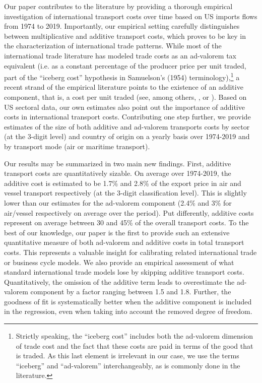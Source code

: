 \documentclass[a4paper,11pt]{article}
\begin{document}
Our paper contributes to the literature by providing a thorough empirical investigation of international transport costs over time based on US imports flows from 1974 to 2019. Importantly, our empirical setting carefully distinguishes between multiplicative and additive transport costs, which proves to be key in the characterization of international trade patterns. While most of the international trade literature has modeled trade costs as an ad-valorem tax equivalent (i.e. as a constant percentage of the producer price per unit traded, part of the ``iceberg cost'' hypothesis in Samuelson's (1954) terminology\cite{samuelson1954}),\footnote{Strictly speaking, the ``iceberg cost'' includes both the ad-valorem dimension of trade cost and the fact that these costs are paid in terms of the good that is traded.
As this last element is irrelevant in our case, we use the terms ``iceberg'' and ``ad-valorem'' interchangeably, as is commonly done in the literature.} a recent strand of the empirical literature points to the existence of an additive component, that is, a cost per unit traded (see, among others, \cite{Irrazabal_2015}, or \cite{martin2012}). Based on US sectoral data, our own estimates also point out the importance of additive costs in international transport costs. Contributing one step further, we provide estimates of the size of both additive and ad-valorem transports costs by sector (at the 3-digit level) and country of origin on a yearly basis over 1974-2019 and by transport mode (air or maritime transport).\smallskip


Our results may be summarized in two main new findings.
First, additive transport costs are quantitatively sizable.
On average over 1974-2019, the additive cost is estimated to be 1.7\% and 2.8\% of the export price in air and vessel transport respectively (at the 3-digit classification level). This is slightly lower than our estimates for the ad-valorem component (2.4\% and 3\% for air/vessel respectively on average over the period).
Put differently, additive costs represent on average between 30 and 45\% of the overall transport costs. To the best of our knowledge, our paper is the first to provide such an extensive quantitative measure of both ad-valorem and additive costs in total transport costs.
This represents a valuable insight for calibrating related international trade or business cycle models.
We also provide an empirical assessment of what standard international trade models lose by skipping additive transport costs.
Quantitatively, the omission of the additive term leads to overestimate the ad-valorem component by a factor ranging between 1.5 and 1.8. Further, the goodness of fit is systematically better when the additive component is included in the regression, even when taking into account the removed degree of freedom.\smallskip
\end{document}
